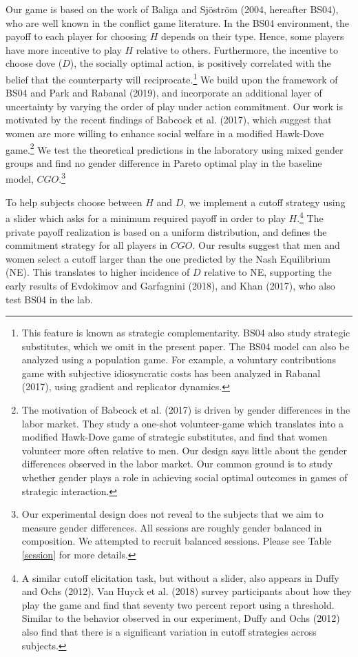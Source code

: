 \documentclass[11pt, letterpaper]{article}
\theoremstyle{plain}
\begin{document}
Our game is based on the work of Baliga and
Sj\"ostr\"om (2004, hereafter BS04), who are well known in the conflict game literature. In the BS04 environment, the payoff to each player for choosing $H$ depends on their type. Hence, some players have more
incentive to play $H$ relative to others. Furthermore, the incentive
to choose dove ($D$), the socially optimal action, is positively
correlated with the belief that the counterparty will
reciprocate.\footnote{This feature is known as strategic
  complementarity. BS04 also study strategic substitutes, which we
  omit in the present paper. The BS04 model can also be analyzed using a population game. For example, a voluntary contributions game with subjective idiosyncratic costs has been analyzed in Rabanal (2017), using gradient and replicator dynamics.} We build upon the framework of BS04 and Park and Rabanal (2019), and incorporate an additional layer of uncertainty by varying the order of play under action commitment. Our work is motivated by the recent findings of Babcock et al. (2017), which suggest that women are more willing to enhance social welfare in a modified Hawk-Dove game.\footnote{The motivation of Babcock et al. (2017) is driven by gender differences in the labor market. They study a one-shot volunteer-game which translates into a modified Hawk-Dove game of strategic substitutes, and find that women volunteer more often relative to men. Our design says little about the gender differences observed in the labor market. Our common ground is to study whether gender plays a role in achieving social optimal outcomes in games of strategic interaction.}
  We test the theoretical predictions in the laboratory using mixed gender groups and find no gender difference in Pareto optimal play in the baseline model, $CGO$.\footnote{Our experimental design does not reveal to the subjects that we aim to measure gender differences. All sessions are roughly gender balanced in composition. We attempted to recruit balanced sessions. Please see Table \ref{session} for more details.}  

To help subjects choose between $H$ and $D$, we implement a cutoff strategy using a slider which asks for a minimum required payoff in order to play $H$.\footnote{A similar cutoff elicitation task, but without a slider, also appears in Duffy and Ochs (2012). Van Huyck et al. (2018) survey participants about how they play the game and find that seventy two percent report using a threshold. Similar to the behavior observed in our experiment, Duffy and Ochs (2012) also find that there is a significant variation in cutoff strategies across subjects.} The private payoff realization is based on a uniform distribution, and defines the commitment strategy for all players in $CGO$. Our results suggest that men and women select a cutoff larger than the one predicted by the Nash Equilibrium (NE). This translates to higher incidence of $D$ relative to NE, supporting the early results of Evdokimov and Garfagnini (2018), and Khan (2017), who also test BS04 in the lab.
\end{document}
